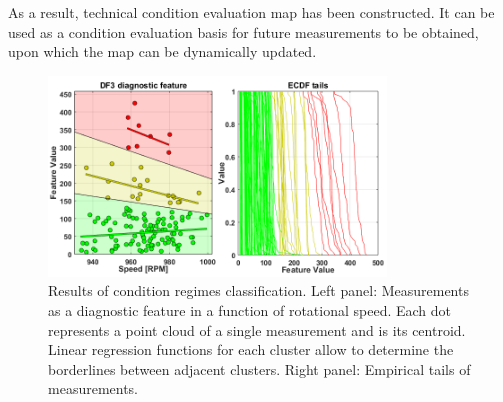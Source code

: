 \documentclass[10pt]{article}
\begin{document}
As a result, technical condition evaluation map has been constructed. It can be used as a condition evaluation basis for future measurements to be obtained, upon which the map can be dynamically updated.

\begin{figure}[h!]
\centering
\includegraphics[width=0.8\textwidth]{wykresy/out.png}
\vspace{-5pt}
\caption{Results of condition regimes classification. Left panel: Measurements as a diagnostic feature in a function of rotational speed. Each dot represents a point cloud of a single measurement and is its centroid. Linear regression functions for each cluster allow to determine the borderlines between adjacent clusters. Right panel: Empirical tails of measurements.}
\label{fig:out}
\end{figure}
\vspace{-10pt}
\end{document}
